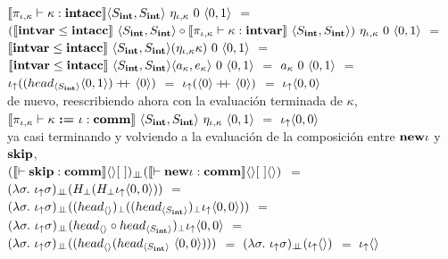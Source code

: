 $\llbracket \pi_{\iota,\kappa} \vdash \kappa : \textbf{intacc} \rrbracket
	\langle S_{\textbf{int}},S_{\textbf{int}} \rangle 
	\ \eta_{\iota,\kappa}
	\ 0 \ \langle 0,1 \rangle$ $=$\\
	\indent
$(\semBrcks{\intvar \leq \intacc} \ \lrangles{S_\intt,S_\intt}
	\circ 
	\semBrcks{ \pi_{\iota,\kappa} \vdash \kappa : \intvar } \ \lrangles{S_\intt,S_\intt})
		\ \eta_{\iota,\kappa} 
		\ 0 \ \lrangles{0,1}$ $=$\\
	\indent
$\semBrcks{\intvar \leq \intacc} \ \lrangles{S_\intt,S_\intt} (\eta_{\iota,\kappa} \kappa)
		\ 0 \ \lrangles{0,1}$ $=$\\
	\indent
$\semBrcks{\intvar \leq \intacc} \ \lrangles{S_\intt,S_\intt} \lrangles{a_\kappa,e_\kappa}
		\ 0 \ \lrangles{0,1}$ $=$ $a_\kappa \ 0 \ \langle 0,1 \rangle$ $=$\\
	\indent
$\iota_{\uparrow} ((head_{\langle S_{\textbf{int}} \rangle} \langle 0,1 \rangle) +\kern-1.3ex+\kern0.8ex \langle 0 \rangle)$ $=$
$\iota_{\uparrow} (\langle 0 \rangle +\kern-1.3ex+\kern0.8ex \langle 0 \rangle)$ $=$ $\iota_{\uparrow} \langle 0,0 \rangle$\\

de nuevo, reescribiendo ahora con la evaluaci\'on terminada de $\kappa$,\\

$\llbracket \pi_{\iota,\kappa} \vdash \kappa \ \textbf{:=} \ \iota: \textbf{comm} \rrbracket
		\ \langle S_{\textbf{int}},S_{\textbf{int}} \rangle \ \eta_{\iota,\kappa}
		\ \langle 0,1 \rangle$ $=$ $\iota_{\uparrow} \langle 0,0 \rangle$\\
		
ya casi terminando y volviendo a la evaluaci\'on de la composici\'on entre
$\textbf{new} \iota$ y $\textbf{skip}$, \\

$(\llbracket \vdash \textbf{skip} : \textbf{comm} \rrbracket\langle  \rangle[ \ ])_{\bot \!\!\! \bot}
(\llbracket \vdash \textbf{new} \iota : \textbf{comm} \rrbracket\langle  \rangle[ \ ]\langle  \rangle)$
$=$\\
\indent 
$(\lambda \sigma . \ \iota_{\uparrow} \sigma)_{\bot \!\!\! \bot} (H_{\bot} (H_{\bot} \iota_{\uparrow} \langle 0,0 \rangle))$ $=$\\
\indent
$(\lambda \sigma . \ \iota_{\uparrow} \sigma)_{\bot \!\!\! \bot}
	((head_{\langle  \rangle})_{\bot} ((head_{\langle S_{\textbf{int}} \rangle})_{\bot} \iota_{\uparrow} \langle 0,0 \rangle))$ $=$\\
\indent
$(\lambda \sigma . \ \iota_{\uparrow} \sigma)_{\bot \!\!\! \bot}
	(head_{\langle  \rangle} \circ head_{\langle S_{\textbf{int}} \rangle})_{\bot} \iota_{\uparrow} \langle 0,0 \rangle$ $=$\\
\indent
$(\lambda \sigma . \ \iotabot \sigma)_{\dbot}
	((head_{\lrangles{}} (head_{\lrangles{S_\intt}} \ \lrangles{0,0})))$ $=$
$(\lambda \sigma . \ \iota_{\uparrow} \sigma)_{\bot \!\!\! \bot} (\iota_{\uparrow} \langle  \rangle)$ $=$ 
$\iota_{\uparrow} \langle  \rangle$\\


